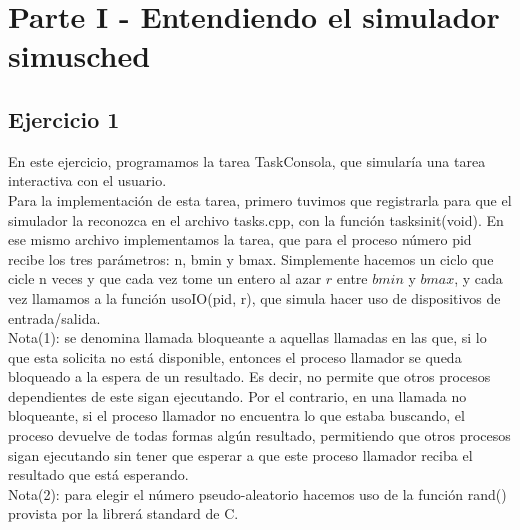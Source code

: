 \documentclass[a4paper]{article}
\begin{document}
\section{Parte I - Entendiendo el simulador simusched}

\subsection{Ejercicio 1}
En este ejercicio, programamos la tarea TaskConsola, que simular\'ia una tarea interactiva con
el usuario. \\
Para la implementaci\'on de esta tarea, primero tuvimos que registrarla para que el simulador la 
reconozca en el archivo tasks.cpp, con la funci\'on tasksinit(void). En ese mismo archivo implementamos
la tarea, que para el proceso n\'umero pid recibe los tres par\'ametros: n, bmin y bmax. Simplemente
hacemos un ciclo que cicle n veces y que cada vez tome un entero al azar $r$ entre $bmin$ y 
$bmax$, y cada vez llamamos a la funci\'on usoIO(pid, r), que simula hacer uso de dispositivos de
entrada/salida. \\
Nota(1): se denomina llamada bloqueante a aquellas llamadas en las que, si lo que esta  
solicita no est\'a disponible, entonces el proceso llamador se queda bloqueado a la espera de un
resultado. Es decir, no permite que otros procesos dependientes de este sigan ejecutando. Por 
el contrario, en una llamada no bloqueante, si el proceso llamador no encuentra lo que estaba
buscando, el proceso devuelve de todas formas alg\'un resultado, permitiendo que otros procesos
sigan ejecutando sin tener que esperar a que este proceso llamador reciba el resultado que est\'a
esperando. \\
Nota(2): para elegir el n\'umero pseudo-aleatorio hacemos uso de la funci\'on rand() provista
por la librer\'a standard de C. \\
\end{document}
